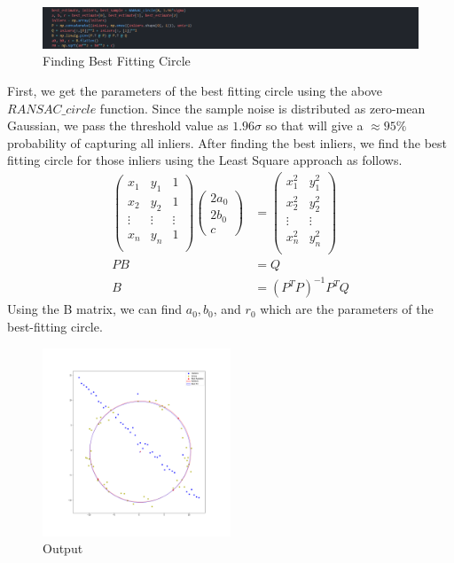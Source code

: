 \documentclass[a4paper]{article}
\begin{document}
\begin{figure}[!htb]
  \centering
  \includegraphics[width=\textwidth]{images/best_fit.png}
  \caption{Finding Best Fitting Circle}
  \label{bestfit}
\end{figure}
First, we get the parameters of the best fitting circle using the above 
$RANSAC\_circle$ function. Since the sample noise is distributed as zero-mean
 Gaussian, we pass the threshold value as $1.96\sigma$ so that will give
  a $\approx95\%$ probability of capturing all inliers. After
   finding the best inliers, we find the best fitting circle for
    those inliers using the Least Square approach as follows.
    \begin{align*}
      \begin{pmatrix}
        x_1 & y_1 & 1\\
        x_2 & y_2 & 1\\
        \vdots & \vdots & \vdots\\
        x_n & y_n & 1\\
      \end{pmatrix}
      \begin{pmatrix}
        2a_0 \\ 2b_0 \\ c
      \end{pmatrix}&=
      \begin{pmatrix}
        x_1^2 & y_1^2\\
        x_2^2 & y_2^2\\
        \vdots & \vdots \\
        x_n^2 & y_n^2\\
      \end{pmatrix}\\
      PB&=Q\\
      B&=(P^T P)^{-1}P^T Q
    \end{align*}
    Using the B matrix, we can find
     $a_0, b_0$, and $r_0$ which are the parameters of the best-fitting
      circle.
\begin{figure}[!htb]
  \centering
  \includegraphics[width=0.5\textwidth]{images/ransac.png}
  \caption{Output}
  \label{ransac}
\end{figure}
\end{document}
